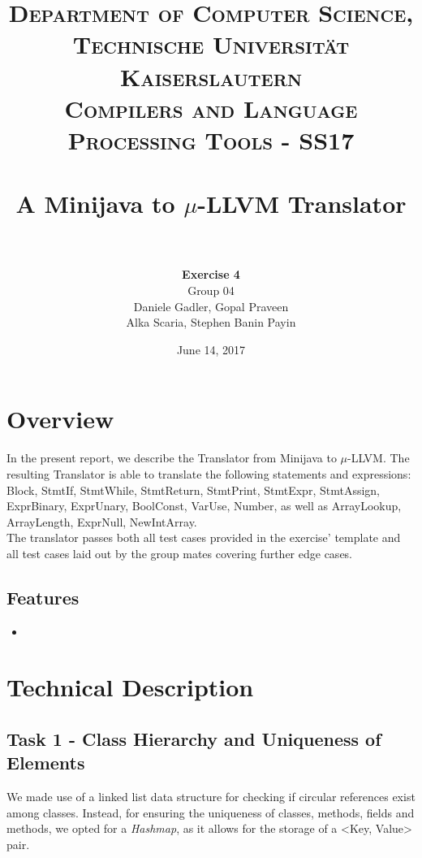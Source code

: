 \documentclass[paper=a4, fontsize=11pt]{scrartcl}
\title{
		\usefont{OT1}{bch}{b}{n}
		\normalfont \normalsize \textsc{Department of Computer Science, Technische Universit\"at Kaiserslautern\\
Compilers and Language Processing Tools - SS17
		} \\ [2pt]
		\horrule{0.5pt} \\[0.4cm]
		\huge A Minijava to $\mu$-LLVM Translator\\
		\horrule{2pt} \\[0.5cm]
}
\author{	
		\textbf{Exercise 4}\\
		Group 04\\
        Daniele Gadler, Gopal Praveen\\Alka Scaria, Stephen Banin Payin \\[-1pt]		\normalsize
}
\date{June 14, 2017}
\numberwithin{equation}{section}		%
\numberwithin{figure}{section}			%
\numberwithin{table}{section}				%
\begin{document}
\maketitle

\section*{Overview}
In the present report, we describe the Translator from Minijava to $\mu$-LLVM. The resulting Translator is able to translate the following statements and expressions: Block, StmtIf, StmtWhile, StmtReturn, StmtPrint, StmtExpr,
StmtAssign, ExprBinary, ExprUnary, BoolConst, VarUse, Number, as well as ArrayLookup, ArrayLength, ExprNull, NewIntArray. \\
The translator passes both all test cases provided in the exercise' template and all test cases laid out by the group mates covering further edge cases. 

\subsection*{Features}

\begin{itemize}

\item \textbf{} 
\end{itemize}

\section*{Technical Description}

\subsection*{Task 1 - Class Hierarchy and Uniqueness of Elements}
We made use of a linked list data structure for checking if circular references exist among classes. Instead, for ensuring the uniqueness of classes, methods, fields and methods, we opted for a \textit{Hashmap}, as it allows for the storage of a <Key, Value> pair. 
\end{document}
